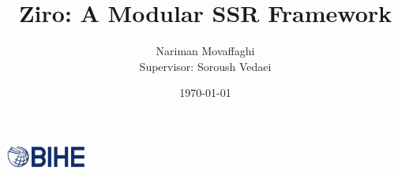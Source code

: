 \documentclass{article}
\author{Nariman Movaffaghi \\[0.4em]
Supervisor: Soroush Vedaei}
\title{Ziro: A Modular SSR Framework}
\date{\small \today}
\begin{document}
\maketitle

\begin{center}
    \vspace{0em}
    \includegraphics[width=0.2\textwidth]{bihe-logo.png} \\[1em]
\end{center}


\pagebreak

\tableofcontents
\pagebreak









\end{document}
